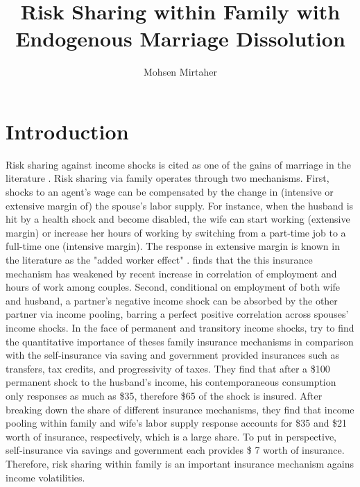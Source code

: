 


\title{Risk Sharing within Family with Endogenous Marriage Dissolution}
\author{Mohsen Mirtaher}
\date{}
\maketitle

\section{Introduction}



Risk sharing against income shocks is cited as one of the gains of marriage in the literature \citep{Chiappori_Mazzocco_2014}. Risk sharing via family operates through two mechanisms. First, shocks to an agent's wage can be compensated by the change in (intensive or extensive margin of) the spouse's labor supply. For instance, when the husband is hit by a health shock and become disabled, the wife can start working (extensive margin) or increase her hours of working by switching from a part-time job to a full-time one (intensive margin). The response in extensive margin is known in the literature as the "added worker effect" \citep{Hyslop_2001}. \citet{Juhn_Potter_2007} finds that the this insurance mechanism has weakened by recent increase in correlation of employment and hours of work among couples. Second, conditional on employment of both wife and husband,  a partner's negative income shock can be absorbed by the other partner via income pooling, barring a perfect positive correlation across spouses' income shocks. In the face of permanent and transitory income shocks, \citet{Blundell_etal_2015_Con-Ineq} try to find the quantitative importance of theses family insurance mechanisms in comparison with the self-insurance via saving and government provided insurances such as transfers, tax credits, and progressivity of taxes. They find that after a \$100 permanent shock to the husband's income, his contemporaneous consumption only responses as much as \$35, therefore \$65 of the shock is insured. After breaking down the share of different insurance mechanisms, they find that income pooling within family and wife's labor supply response accounts for \$35 and \$21 worth of insurance, respectively, which is a large share. To put in perspective, self-insurance via savings and government each provides \$ 7 worth of insurance. Therefore, risk sharing within family is an important insurance mechanism agains income volatilities.  \\

